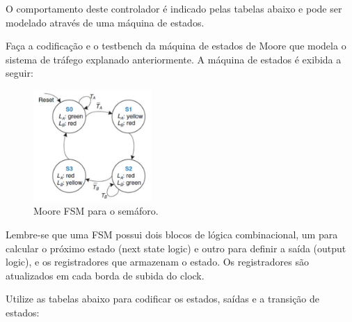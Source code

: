 \documentclass[a4paper]{article}
\begin{document}
O comportamento deste controlador é indicado pelas tabelas abaixo e pode ser modelado através de uma máquina de estados.

Faça a codificação e o testbench da máquina de estados de Moore que modela o sistema de tráfego explanado anteriormente. A máquina de estados é exibida a seguir:

\begin{figure}[H]
	\centering
    \includegraphics[width=0.4\textwidth]{images/Moore_FSM.jpg}
    \caption*{Moore FSM para o semáforo.}
\end{figure}

Lembre-se que uma FSM possui dois blocos de lógica combinacional, um para calcular o próximo estado (next state logic) e outro para definir a saída (output logic), e os registradores que armazenam o estado. Os registradores são atualizados em cada borda de subida do clock. 

Utilize as tabelas abaixo para codificar os estados, saídas e a transição de estados:
\end{document}
